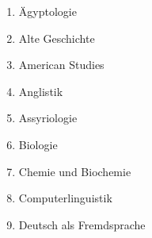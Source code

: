     \begin{enumerate}[noitemsep]
        \item Ägyptologie                                                                                                                                                                                                  \\
        \item Alte Geschichte                                                                                                                                                                                              \\
        \item American Studies                                                                                                                                                                                             \\
        \item Anglistik                                                                                                                                                                                                    \\
        \item Assyriologie                                                                                                                                                                                                 \\
        \item Biologie                                                                                                                                                                                                     \\
        \item Chemie und Biochemie                                                                                                                                                                                         \\
        \item Computerlinguistik                                                                                                                                                                                           \\
        \item Deutsch als Fremdsprache                                                                                                                                                                                     \\

\end{enumerate}
